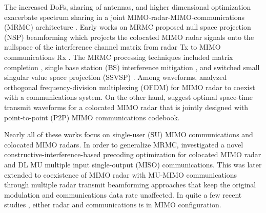 \documentclass[9pt,journal]{IEEEtran}
\theoremstyle{definition}
\begin{document}
The increased DoFs, sharing of antennas, and higher dimensional optimization exacerbate spectrum sharing in a joint MIMO-radar-MIMO-communications (MRMC) architecture \cite{alaee2020information,dokhanchi2020multi}. %
Early works on MRMC proposed null space projection (NSP) beamforming which projects the colocated MIMO radar signals onto the nullspace of the interference channel matrix from radar Tx to MIMO communications Rx \cite{khawar2015target}. The MRMC processing techniques included matrix completion \cite{li2016optimum}, single base station (BS) interference mitigation \cite{khawar2015target}, and switched small singular value space projection (SSVSP) \cite{mahal2017spectral}. %
Among waveforms, \cite{bao2019precoding} analyzed orthogonal frequency-division multiplexing (OFDM) for MIMO radar to coexist with a communications system. On the other hand, \cite{qian2018joint,rihan2018optimum} suggest optimal space-time transmit waveforms for a colocated MIMO radar that is jointly designed with point-to-point (P2P) MIMO communications codebook.
	
	Nearly all of these works focus on single-user (SU) MIMO communications and colocated MIMO radars. In order to generalize MRMC, \cite{liu2018mimo} investigated a novel constructive-interference-based precoding optimization for colocated MIMO radar and DL MU multiple input single-output (MISO) communications. This was later extended to coexistence of MIMO radar with MU-MIMO communications \cite{liu2018mu} through multiple radar transmit beamforming approaches that keep the original modulation and communications data rate unaffected. In quite a few recent studies \cite{d2020uplink,grossi2020joint}, either radar and communications is in MIMO configuration. %
	
\end{document}
